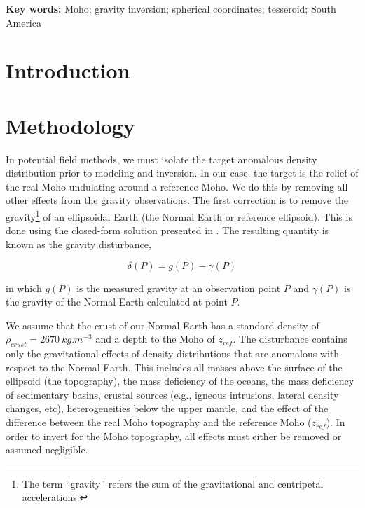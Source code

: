 \documentclass[extra,mreferee]{gji}
\title[]{\Title}
\author[]{
    Leonardo Uieda$^{1,2}$,
    Valéria C. F. Barbosa$^{2}$
    \\
    $^1$Universidade do Estado do Rio de Janeiro, Rio de Janeiro, Brazil.
    e-mail: leo@leouieda.com
    \\
    $^2$Observatório Nacional, Rio de Janeiro, Brazil.
}
\newcommand{\Keywords}{
        Moho;
        gravity inversion;
        spherical coordinates;
        tesseroid;
        South America
}
\begin{document}
\maketitle


\begin{abstract}
\end{abstract}

\noindent\textbf{Key words:} \Keywords


\section{Introduction}


\section{Methodology}

In potential field methods,
we must isolate the target anomalous density distribution prior to modeling and
inversion.
In our case, the target is the relief of the real Moho undulating around a
reference Moho.
We do this by removing all other effects from the gravity observations.
The first correction is to remove the
gravity\footnote{The term ``gravity'' refers the sum of the gravitational and
centripetal accelerations.}
of an ellipsoidal Earth (the Normal Earth or reference ellipsoid).
This is done using the closed-form solution presented in
\citet{li_ellipsoid_2001}.
The resulting quantity is known as the gravity disturbance,

\begin{equation}
    \delta(P) = g(P) - \gamma(P)
\end{equation}

\noindent in which $g(P)$ is the measured gravity at an observation point $P$
and $\gamma(P)$ is the gravity of the Normal Earth
calculated at point $P$.

We assume that the crust of our Normal Earth has a standard density of
$\rho_{crust} = 2670\ kg.m^{-3}$ and a depth to the Moho of $z_{ref}$.
The disturbance contains only the gravitational effects of density
distributions that are anomalous with respect to the Normal Earth.
This includes all masses above the surface of the ellipsoid (the topography),
the mass deficiency of the oceans,
the mass deficiency of sedimentary basins,
crustal sources (e.g., igneous intrusions, lateral density changes, etc),
heterogeneities below the upper mantle,
and
the effect of the difference between the real Moho
topography and the reference Moho ($z_{ref}$).
In order to invert for the Moho topography, all effects must either be removed
or assumed negligible.
\end{document}
